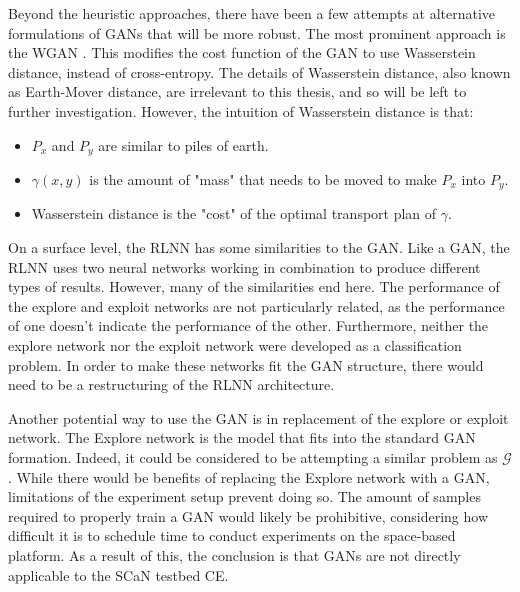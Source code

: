 	\par Beyond the heuristic approaches, there have been a few attempts at alternative formulations of GANs that will be more robust. The most prominent approach is the WGAN \cite{bg:wganPaper}. This modifies the cost function of the GAN to use Wasserstein distance, instead of cross-entropy. The details of Wasserstein distance, also known as Earth-Mover distance, are irrelevant to this thesis, and so will be left to further investigation. However, the intuition of Wasserstein distance is that:  
	\begin{itemize}
		\item $P_x$ and $P_y$ are similar to piles of earth. 
		\item $\gamma(x,y)$ is the amount of "mass" that needs to be moved to make $P_x$ into $P_y$.
		\item Wasserstein distance is the "cost" of the optimal transport plan of $\gamma$.
	\end{itemize}
	\par On a surface level, the RLNN has some similarities to the GAN. Like a GAN, the RLNN uses two neural networks working in combination to produce different types of results. However, many of the similarities end here. The performance of the explore and exploit networks are not particularly related, as the performance of one doesn't indicate the performance of the other. Furthermore, neither the explore network nor the exploit network were developed as a classification problem. In order to make these networks fit the GAN structure, there would need to be a restructuring of the RLNN architecture.
	\par Another potential way to use the GAN is in replacement of the explore or exploit network. The Explore network is the model that fits into the standard GAN formation. Indeed, it could be considered to be attempting a similar problem as $\mathcal{G}$. While there would be benefits of replacing the Explore network with a GAN, limitations of the experiment setup prevent doing so. The amount of samples required to properly train a GAN would likely be prohibitive, considering how difficult it is to schedule time to conduct experiments on the space-based platform. As a result of this, the conclusion is that GANs are not directly applicable to the SCaN testbed CE.
	
%